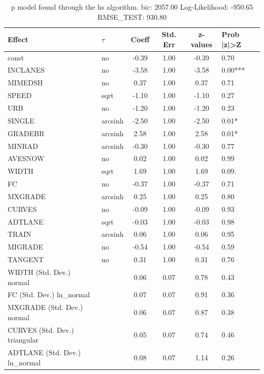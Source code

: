 \begin{table}
	\caption{p model found through the hs algorithm. bic: 2057.00 Log-Likelihood: -950.65 RMSE_TEST: 930.80}
	\begin{center}
		\begin{tabular}{|l|l|c|c|c|l|}
			\hline
			Effect & $\tau$ & Coeff & Std. Err & z-values & Prob |z|>Z \\
			\hline
			const & no & -0.39 & 1.00 & -0.39 & 0.70 \\
			\hline
			INCLANES & no & -3.58 & 1.00 & -3.58 & 0.00*** \\
			\hline
			MIMEDSH & no & 0.37 & 1.00 & 0.37 & 0.71 \\
			\hline
			SPEED & sqrt & -1.10 & 1.00 & -1.10 & 0.27 \\
			\hline
			URB & no & -1.20 & 1.00 & -1.20 & 0.23 \\
			\hline
			SINGLE & arcsinh & -2.50 & 1.00 & -2.50 & 0.01* \\
			\hline
			GRADEBR & arcsinh & 2.58 & 1.00 & 2.58 & 0.01* \\
			\hline
			MINRAD & arcsinh & -0.30 & 1.00 & -0.30 & 0.77 \\
			\hline
			AVESNOW & no & 0.02 & 1.00 & 0.02 & 0.99 \\
			\hline
			WIDTH & sqrt & 1.69 & 1.00 & 1.69 & 0.09. \\
			\hline
			FC & no & -0.37 & 1.00 & -0.37 & 0.71 \\
			\hline
			MXGRADE & arcsinh & 0.25 & 1.00 & 0.25 & 0.80 \\
			\hline
			CURVES & no & -0.09 & 1.00 & -0.09 & 0.93 \\
			\hline
			ADTLANE & sqrt & -0.03 & 1.00 & -0.03 & 0.98 \\
			\hline
			TRAIN & arcsinh & 0.06 & 1.00 & 0.06 & 0.95 \\
			\hline
			MIGRADE & no & -0.54 & 1.00 & -0.54 & 0.59 \\
			\hline
			TANGENT & no & 0.31 & 1.00 & 0.31 & 0.76 \\
			\hline
			WIDTH (Std. Dev.) normal &  & 0.06 & 0.07 & 0.78 & 0.43 \\
			\hline
			FC (Std. Dev.) ln_normal &  & 0.07 & 0.07 & 0.91 & 0.36 \\
			\hline
			MXGRADE (Std. Dev.) normal &  & 0.06 & 0.07 & 0.87 & 0.38 \\
			\hline
			CURVES (Std. Dev.) triangular &  & 0.05 & 0.07 & 0.74 & 0.46 \\
			\hline
			ADTLANE (Std. Dev.) ln_normal &  & 0.08 & 0.07 & 1.14 & 0.26 \\

\end{tabular}
\end{center}
\end{table}
